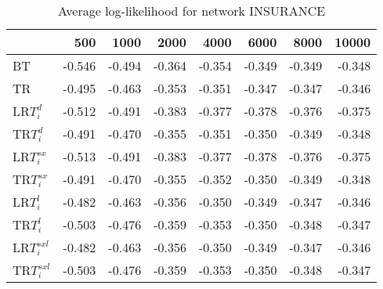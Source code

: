 \begin{table}
 \begin{center}
 \begin{tabular}{lrrrrrrr}
 & 500 & 1000 & 2000 & 4000 & 6000 & 8000 & 10000\\\hline
BT & -0.546 & -0.494 & -0.364 & -0.354 & -0.349 & -0.349 & -0.348\\\hline
TR & -0.495 & -0.463 & -0.353 & -0.351 & -0.347 & -0.347 & -0.346\\\hline
LR$T_i^d$ & -0.512 & -0.491 & -0.383 & -0.377 & -0.378 & -0.376 & -0.375\\\hline
TR$T_i^d$ & -0.491 & -0.470 & -0.355 & -0.351 & -0.350 & -0.349 & -0.348\\\hline
LR$T_i^{sx}$ & -0.513 & -0.491 & -0.383 & -0.377 & -0.378 & -0.376 & -0.375\\\hline
TR$T_i^{sx}$ & -0.491 & -0.470 & -0.355 & -0.352 & -0.350 & -0.349 & -0.348\\\hline
LR$T_i^l$ & -0.482 & -0.463 & -0.356 & -0.350 & -0.349 & -0.347 & -0.346\\\hline
TR$T_i^l$ & -0.503 & -0.476 & -0.359 & -0.353 & -0.350 & -0.348 & -0.347\\\hline
LR$T_i^{sxl}$ & -0.482 & -0.463 & -0.356 & -0.350 & -0.349 & -0.347 & -0.346\\\hline
TR$T_i^{sxl}$ & -0.503 & -0.476 & -0.359 & -0.353 & -0.350 & -0.348 & -0.347\\\hline
\end{tabular}
\end{center}
\caption{Average log-likelihood for network INSURANCE }
\label{Insurancell}
\end{table}


